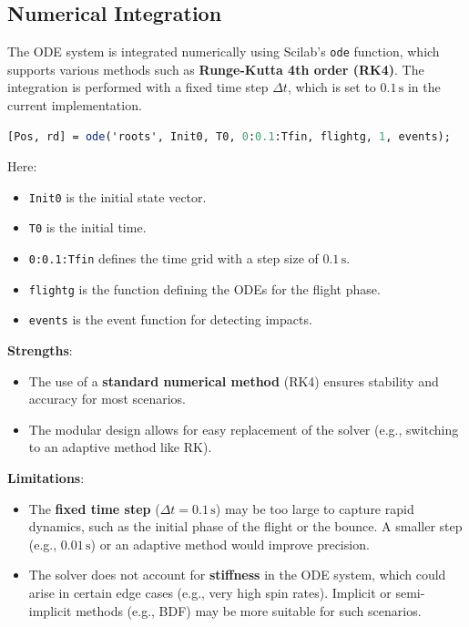 \documentclass[10pt,a4paper]{report}
\begin{document}
\subsection{Numerical Integration}
\label{subsec:numerical_integration}

The ODE system is integrated numerically using Scilab's \texttt{ode} function, which supports various methods such as \textbf{Runge-Kutta 4th order (RK4)}. The integration is performed with a fixed time step \( \Delta t \), which is set to \( 0.1 \, \text{s} \) in the current implementation.

\begin{lstlisting}[language=Scilab]
[Pos, rd] = ode('roots', Init0, T0, 0:0.1:Tfin, flightg, 1, events);
\end{lstlisting}
Here:
\begin{itemize}
    \item \texttt{Init0} is the initial state vector.
    \item \texttt{T0} is the initial time.
    \item \texttt{0:0.1:Tfin} defines the time grid with a step size of \( 0.1 \, \text{s} \).
    \item \texttt{flightg} is the function defining the ODEs for the flight phase.
    \item \texttt{events} is the event function for detecting impacts.
\end{itemize}

\textbf{Strengths}:
\begin{itemize}
    \item The use of a \textbf{standard numerical method} (RK4) ensures stability and accuracy for most scenarios.
    \item The modular design allows for easy replacement of the solver (e.g., switching to an adaptive method like RK).
\end{itemize}

\textbf{Limitations}:
\begin{itemize}
    \item The \textbf{fixed time step} (\( \Delta t = 0.1 \, \text{s} \)) may be too large to capture rapid dynamics, such as the initial phase of the flight or the bounce. A smaller step (e.g., \( 0.01 \, \text{s} \)) or an adaptive method would improve precision.
    \item The solver does not account for \textbf{stiffness} in the ODE system, which could arise in certain edge cases (e.g., very high spin rates). Implicit or semi-implicit methods (e.g., BDF) may be more suitable for such scenarios.
\end{itemize}
\end{document}
